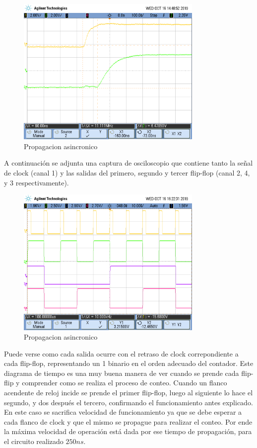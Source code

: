 \begin{figure}[H]
	\centering
	\includegraphics[width=0.8\textwidth]{Ejercicio7/Recursos/propagacion_asincronico.png}
	\caption{Propagacion asincronico}
\end{figure}

A continuación se adjunta una captura de osciloscopio que contiene tanto la señal de clock (canal 1) y las salidas del primero, segundo y tercer flip-flop (canal 2, 4, y 3 respectivamente). 

\begin{figure}[H]
	\centering
	\includegraphics[width=0.8\textwidth]{Ejercicio7/Recursos/senales_asincronico.png}
	\caption{Propagacion asincronico}
\end{figure}

Puede verse como cada salida ocurre con el retraso de clock correpondiente a cada flip-flop, representando un 1 binario en el orden adecuado del contador. Este diagrama de tiempo es una muy buena manera de ver cuando se prende cada flip-flip y comprender como se realiza el proceso de conteo. Cuando un flanco acendente de reloj incide se prende el primer flip-flop, luego al siguiente lo hace el segundo, y dos después el tercero, confirmando el funcionamiento antes explicado. En este caso se sacrifica velocidad de funcionamiento ya que se debe esperar a cada flanco de clock y que el mismo se propague para realizar el conteo. Por ende la máxima velocidad de operación está dada por ese tiempo de propagación, para el circuito realizado $250ns$.


